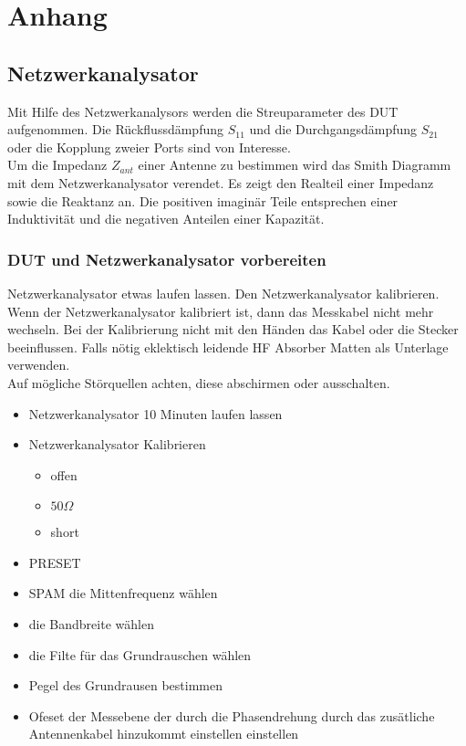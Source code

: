 \chapter{Anhang}
\section{ Netzwerkanalysator}
Mit Hilfe des Netzwerkanalysors werden die Streuparameter des DUT aufgenommen. Die Rückflussdämpfung $S_{11}$ und die Durchgangsdämpfung $S_{21}$ oder die Kopplung zweier Ports sind  von Interesse.\\
Um die Impedanz $Z_{ant}$ einer Antenne zu bestimmen wird das Smith Diagramm mit dem Netzwerkanalysator verendet. Es zeigt den Realteil einer Impedanz sowie die Reaktanz an. Die positiven imaginär Teile entsprechen einer Induktivität  und die negativen Anteilen einer Kapazität.
	
	\subsection{DUT und Netzwerkanalysator vorbereiten}
	Netzwerkanalysator etwas laufen lassen. Den Netzwerkanalysator kalibrieren.  Wenn der Netzwerkanalysator kalibriert ist, dann das Messkabel nicht mehr wechseln. Bei der Kalibrierung nicht mit den Händen das Kabel oder die Stecker beeinflussen. Falls nötig eklektisch leidende HF Absorber Matten als Unterlage verwenden. \\
	Auf mögliche Störquellen achten, diese abschirmen oder ausschalten.
	\begin{itemize}
	\item Netzwerkanalysator 10 Minuten laufen lassen
	\item Netzwerkanalysator Kalibrieren
	\begin{itemize}
	\item offen
	\item $50\Omega$
	\item short
	\end{itemize}

	\item PRESET
	\item SPAM die Mittenfrequenz wählen
	\item die Bandbreite wählen
	\item die Filte für das Grundrauschen wählen
	\item Pegel des Grundrausen bestimmen
		\item Ofeset der Messebene  der durch die Phasendrehung durch das zusätliche Antennenkabel hinzukommt einstellen einstellen
	\end{itemize}
	
